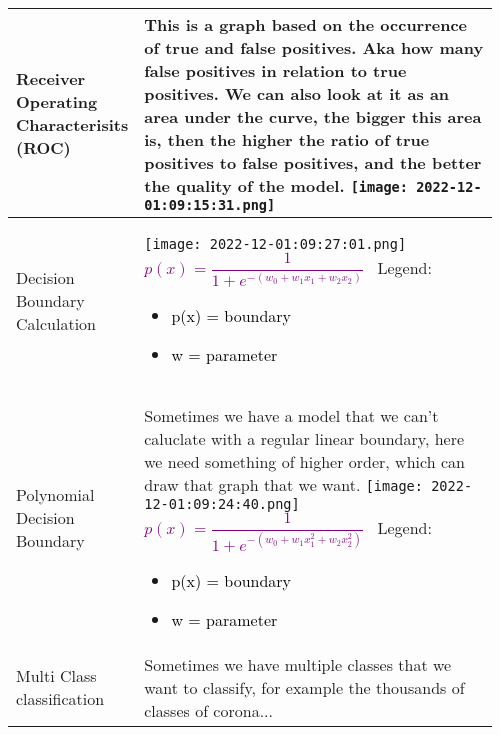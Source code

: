 \documentclass[main.tex,fontsize=8pt,paper=a4,paper=portrait,DIV=calc,]{scrartcl}
\begin{document}
\begin{table}[ht!]
\begin{tabular}{|m{0.2\linewidth}|m{0.755\linewidth}|}
\hline
Receiver Operating Characterisits (ROC) &
This is a graph based on the occurrence of true and false positives.\newline
Aka how many false positives in relation to true positives.\newline
We can also look at it as an area under the curve, the bigger this area is, then the higher the ratio of true positives to false positives, and the better the quality of the model.\newline
\texttt{[image: 2022-12-01:09:15:31.png]}\\
\hline
Decision Boundary Calculation &
\texttt{[image: 2022-12-01:09:27:01.png]}\newline
\large \textcolor{purple}{\(p(x) = \dfrac{1}{1 + e^{-(w_0 + w_1x_1 + w_2x_2)}}\)}\newline
\normalsize \, \newline 
Legend: \newline
\begin{itemize}
\item \textcolor{black}{p(x) = boundary}
\item \textcolor{black}{w = parameter}
\vspace{-3mm}
\end{itemize}\\ 
\hline
Polynomial Decision Boundary & 
Sometimes we have a model that we can't caluclate with a regular linear boundary, here we need something of higher order,\newline
which can draw that graph that we want.\newline
\texttt{[image: 2022-12-01:09:24:40.png]}\newline
\large \textcolor{purple}{\(p(x) = \dfrac{1}{1 + e^{-(w_0 + w_1x_1^2 + w_2x_2^2)}}\)}\newline
\normalsize \, \newline 
Legend: \newline
\begin{itemize}
\item \textcolor{black}{p(x) = boundary}
\item \textcolor{black}{w = parameter}
\vspace{-3mm}
\end{itemize}\\ 
\hline
Multi Class classification & 
Sometimes we have multiple classes that we want to classify, for example the thousands of classes of corona...\newline

\end{tabular}
\end{table}
\end{document}
